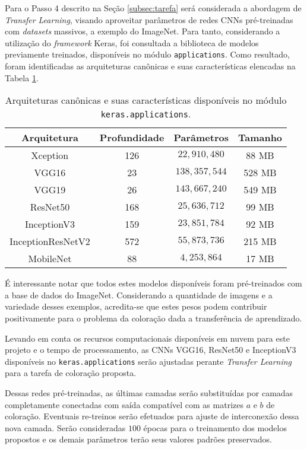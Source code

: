 Para o Passo 4 descrito na Seção \ref{subsec:tarefa} será considerada a abordagem de \emph{Transfer Learning}, visando aproveitar parâmetros de redes CNNs pré-treinadas com \emph{datasets} massivos, a exemplo do ImageNet. Para tanto, considerando a utilização do \emph{framework} Keras, foi consultada a biblioteca de modelos previamente treinados, disponíveis no módulo \texttt{applications}. Como resultado, foram identificadas as arquiteturas canônicas e suas características elencadas na Tabela \ref{tab:cnns}.

\begin{table}[!ht]
	\caption{Arquiteturas canônicas e suas características disponíveis no módulo \texttt{keras.applications}.}
	\centering
	\begin{tabular}{c c c c}
		\toprule
		 Arquitetura & Profundidade & Parâmetros & Tamanho \\
		\midrule
		Xception & 126 & $22,910,480$ & 88 MB \\
		VGG16 & 23 & $138,357,544$ & 528 MB \\
		VGG19 & 26 & $143,667,240$ & 549 MB \\
		ResNet50 & 168 & $25,636,712$ & 99 MB \\ 
		InceptionV3 & 159 & $23,851,784$ & 92 MB \\
		InceptionResNetV2 & 572 & $55,873,736$ & 215 MB \\
		MobileNet & 88 & $4,253,864$ & 17 MB \\
		\bottomrule
	\end{tabular}
	
	\label{tab:cnns}
\end{table}

É interessante notar que todos estes modelos disponíveis foram pré-treinados com a base de dados do ImageNet. Considerando a quantidade de imagens e a variedade desses exemplos, acredita-se que estes pesos podem contribuir positivamente para o problema da coloração dada a transferência de aprendizado.

Levando em conta os recursos computacionais disponíveis em nuvem para este projeto e o tempo de processamento, as CNNs VGG16, ResNet50 e InceptionV3 disponíveis no \texttt{keras.applications} serão ajustadas perante \emph{Transfer Learning} para a tarefa de coloração proposta.

Dessas redes pré-treinadas, as últimas camadas serão substituídas por camadas completamente conectadas com saída compatível com as matrizes $a$ e $b$ de coloração. Eventuais re-treinos serão efetuados para ajuste de interconexão dessa nova camada. Serão consideradas $100$ épocas para o treinamento dos modelos propostos e os demais parâmetros terão seus valores padrões preservados.


